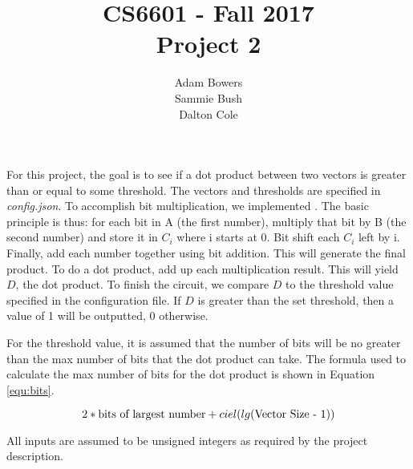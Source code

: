 \documentclass[times]{article}
\begin{document}
	\title{CS6601  - Fall 2017 \\ Project 2}
	\author{Adam Bowers \\ Sammie Bush \\ Dalton Cole}
	\date{}
	\maketitle
	
	For this project, the goal is to see if a dot product between two vectors is greater than or equal to some threshold. The vectors and thresholds are specified in \textit{config.json}. To accomplish bit multiplication, we implemented \cite{ref:mult}. The basic principle is thus: for each bit in A (the first number), multiply that bit by B (the second number) and store it in $C_i$ where i starts at 0. Bit shift each $C_i$ left by i. Finally, add each number together using bit addition. This will generate the final product. To do a dot product, add up each multiplication result. This will yield $D$, the dot product. To finish the circuit, we compare $D$ to the threshold value specified in the configuration file. If $D$ is greater than the set threshold, then a value of 1 will be outputted, 0 otherwise.

	For the threshold value, it is assumed that the number of bits will be no greater than the max number of bits that the dot product can take. The formula used to calculate the max number of bits for the dot product is shown in Equation \ref{equ:bits}.

	\begin{equation}
		\label{equ:bits}
		2 * \textnormal{bits of largest number} + ciel(lg(\textnormal{Vector Size - 1}))
	\end{equation}

	All inputs are assumed to be unsigned integers as required by the project description.


	\medskip
	
	
\end{document}
